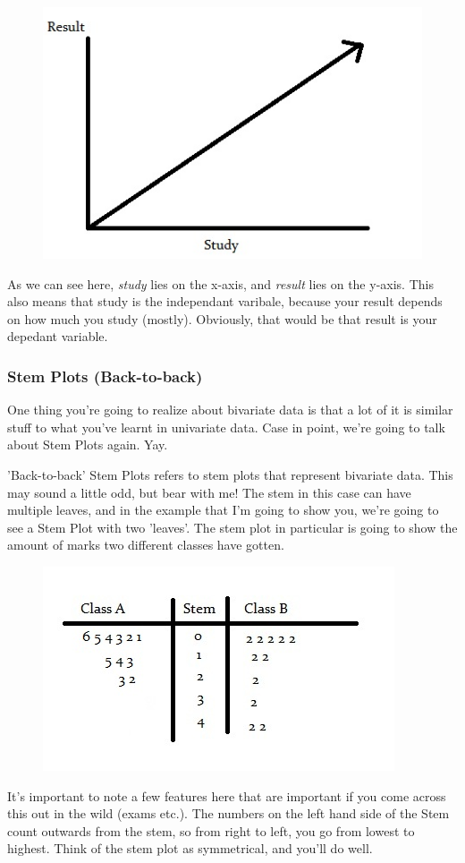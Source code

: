 \documentclass[11pt]{article}
\begin{document}
\clearpage{}
\begin{figure}[htp]
\centering
\includegraphics[scale=0.80]{BiVariableImage11.jpg}
\end{figure}

As we can see here, \emph{study} lies on the x-axis, and \emph{result} lies on the y-axis. This also means that study is the independant varibale, because your result depends on how much you study (mostly). Obviously, that would be that result is your depedant variable. 

\subsubsection*{Stem Plots (Back-to-back)}

One thing you're going to realize about bivariate data is that a lot of it is similar stuff to what you've learnt in univariate data. Case in point, we're going to talk about Stem Plots again. Yay.

'Back-to-back' Stem Plots refers to stem plots that represent bivariate data. This may sound a little odd, but bear with me! The stem in this case can have multiple leaves, and in the example that I'm going to show you, we're going to see a Stem Plot with two 'leaves'. The stem plot in particular is going to show the amount of marks two different classes have gotten.

\clearpage{}
\begin{figure}[htp]
\centering
\includegraphics[scale=1.00]{StemDoubleLeafImage11.jpg}
\end{figure}

It's important to note a few features here that are important if you come across this out in the wild (exams etc.). The numbers on the left hand side of the Stem count outwards from the stem, so from right to left, you go from lowest to highest. Think of the stem plot as symmetrical, and you'll do well. 
\end{document}
